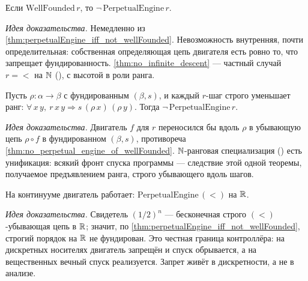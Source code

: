 \begin{theorem}\label{thm:no_perpetual_engine_of_wellFounded}
\green{}\; Если $\mathrm{WellFounded}\,r$, то $\neg\,\mathrm{PerpetualEngine}\,r$.
\end{theorem}

\emph{Идея доказательства.} Немедленно из \cref{thm:perpetualEngine_iff_not_wellFounded}. Невозможность
внутренняя, почти определительная: собственная определяющая цепь двигателя есть ровно то, что запрещает
фундированность. \cref{thm:no_infinite_descent} --- частный случай $r={<}$ на $\mathbb{N}$
(), с высотой в роли ранга.

\begin{theorem}\label{thm:no_perpetual_engine_of_rank}
\green{}\; Пусть $\rho:\alpha\to\beta$ с фундированным $(\beta,s)$, и каждый $r$-шаг строго уменьшает
ранг: $\forall\, x\,y,\ r\,x\,y \Rightarrow s\,(\rho\,x)\,(\rho\,y)$. Тогда
$\neg\,\mathrm{PerpetualEngine}\,r$.
\end{theorem}

\emph{Идея доказательства.} Двигатель $f$ для $r$ переносился бы вдоль $\rho$ в убывающую цепь
$\rho\circ f$ в фундированном $(\beta,s)$, противореча \cref{thm:no_perpetual_engine_of_wellFounded}.
$\mathbb{N}$-ранговая специализация () есть унификация: всякий фронт спуска
программы --- следствие этой одной теоремы, получаемое предъявлением ранга, строго убывающего вдоль
шагов.

\begin{theorem}\label{thm:perpetualEngine_on_real}
\green{}\; На континууме двигатель работает: $\mathrm{PerpetualEngine}\,(<)$ на $\mathbb{R}$.
\end{theorem}

\emph{Идея доказательства.} Свидетель $(1/2)^n$ --- бесконечная строго $(<)$-убывающая цепь в $\mathbb{R}$;
значит, по \cref{thm:perpetualEngine_iff_not_wellFounded}, строгий порядок на $\mathbb{R}$ не фундирован. Это
честная граница контроллёра: на дискретных носителях двигатель запрещён и спуск обрывается, а на
вещественных вечный спуск реализуется. Запрет живёт в дискретности, а не в анализе.

\medskip

